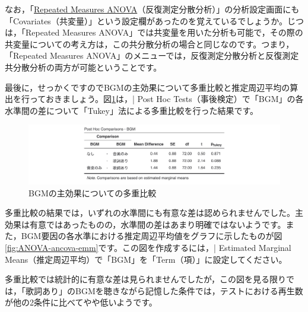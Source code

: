 \documentclass[
  12pt,
  a5jpaper,
  lualatex, ja=standard]{bxjsbook}
\begin{document}
なお，「\protect\hyperlink{sec:ANOVA-rm}{Repeated Measures ANOVA}（反復測定分散分析）」の分析設定画面にも「Covariates（共変量）」という設定欄があったのを覚えているでしょうか。じつは，「Repeated Measures ANOVA」では共変量を用いた分析も可能で，その際の共変量についての考え方は，この共分散分析の場合と同じなのです。つまり，「Repeated Measures ANOVA」のメニューでは，反復測定分散分析と反復測定共分散分析の両方が可能ということです。

最後に，せっかくですのでBGMの主効果について多重比較と推定周辺平均の算出を行っておきましょう。図\ref{fig:ANOVA-ancova-tukey}は，\colorbox{bar}{\textcolor{gmoji2}{| Post Hoc Tests}}（事後検定）で「BGM」の各水準間の差について「Tukey」法による多重比較を行った結果です。

\begin{figure}[!ht]

{\centering \includegraphics[width=1\linewidth]{images/ANOVA/ancova-tukey} 

}

\caption{BGMの主効果についての多重比較}\label{fig:ANOVA-ancova-tukey}
\end{figure}

多重比較の結果では，いずれの水準間にも有意な差は認められませんでした。主効果は有意ではあったものの，水準間の差はあまり明確ではないようです。また，BGM要因の各水準における推定周辺平均値をグラフに示したものが図\ref{fig:ANOVA-ancova-emm}です。この図を作成するには，\colorbox{bar}{\textcolor{gmoji2}{| Estimated Marginal Means}}（推定周辺平均）で「BGM」を「Term（項）」に設定してください。

\clearpage

多重比較では統計的に有意な差は見られませんでしたが，この図を見る限りでは，「歌詞あり」のBGMを聴きながら記憶した条件では，テストにおける再生数が他の2条件に比べてやや低いようです。
\end{document}
